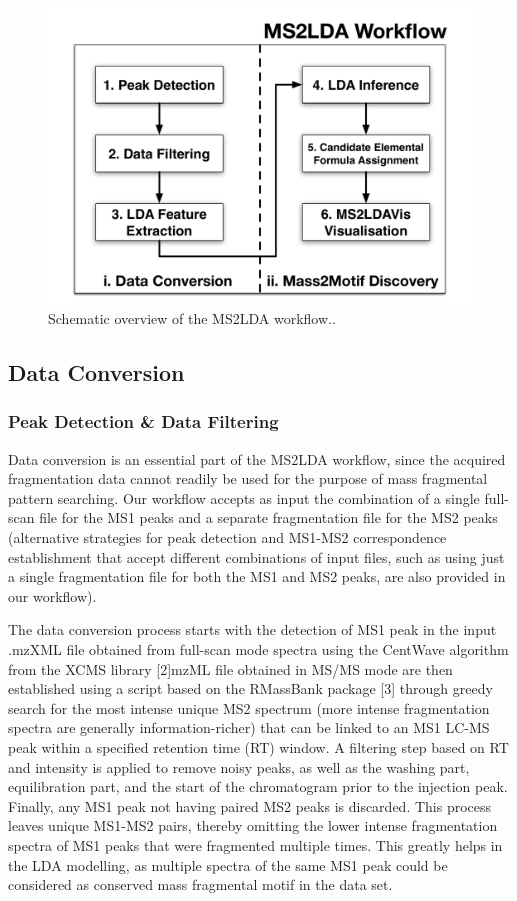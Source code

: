 \begin{figure}[!htbp]
\centering\includegraphics[width=0.7\linewidth]{07-lda/figures/ms2lda.pdf}
\centering\caption{Schematic overview of the MS2LDA workflow..\label{fig:m2lda-workflow}}
\end{figure}

\subsection{Data Conversion\label{sub:data-conversion}}

\subsubsection{Peak Detection \& Data Filtering}

Data conversion is an essential part of the MS2LDA workflow, since the acquired fragmentation data cannot readily be used for the purpose of mass fragmental pattern searching. Our workflow accepts as input the combination of a single full-scan file for the MS1 peaks and a separate fragmentation file for the MS2 peaks (alternative strategies for peak detection and MS1-MS2 correspondence establishment that accept different combinations of input files, such as using just a single fragmentation file for both the MS1 and MS2 peaks, are also provided in our workflow). 

The data conversion process starts with the detection of MS1 peak in the input .mzXML file obtained from full-scan mode spectra using the CentWave algorithm from the XCMS library [2]mzML file obtained in MS/MS mode are then established using a script based on the RMassBank package [3] through greedy search for the most intense unique MS2 spectrum (more intense fragmentation spectra are generally information-richer) that can be linked to an MS1 LC-MS peak within a specified retention time (RT) window. A filtering step based on RT and intensity is applied to remove noisy peaks, as well as the washing part, equilibration part, and the start of the chromatogram prior to the injection peak. Finally, any MS1 peak not having paired MS2 peaks is discarded. This process leaves unique MS1-MS2 pairs, thereby omitting the lower intense fragmentation spectra of MS1 peaks that were fragmented multiple times. This greatly helps in the LDA modelling, as multiple spectra of the same MS1 peak could  be considered as conserved mass fragmental motif in the data set.

